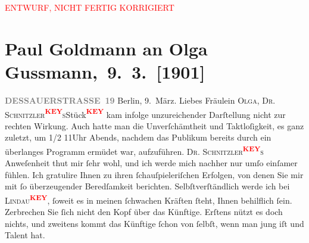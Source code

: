
\begin{center}
            \textcolor{red}{ENTWURF, NICHT FERTIG KORRIGIERT}
                      \end{center}
            
         
         \renewcommand{\erwaehntePersonen}{Personen: Olga Schnitzler}
         \renewcommand{\erwaehnteOrte}{Orte: Berlin, Wien}
         \renewcommand{\erwaehnteWerke}{}
               \section[ Paul Goldmann an Olga Gussmann, 9. 3. {[}1901{]}]{ Paul Goldmann an Olga Gussmann, 9. 3. {[}1901{]}}\nopagebreak{}\rehead{ }\begin{ledgroupsized}[t]{13cm}\normalsize\beginnumbering \toendnotes[C]{\smallbreak\pagebreak[2]} 
\pstart
           \noindent{}\raggedleft{}{\pb}\textcolor{gray}{\textbf{DESSAUERSTRASSE 19}}\pend
           \pstart
           Berlin, 9. März.\pend
           \pstart\center{}Liebes Fräulein \textsc{Olga},\pend\pstart
           \textsc{Dr. Schnitzler\textcolor{red}{\textsuperscript{\textbf{KEY}}}s}Stück\textcolor{red}{\textsuperscript{\textbf{KEY}}} kam infolge unzureichender Darſtellung nicht zur
               rechten Wirkung. Auch hatte man die Unverſchämtheit und Taktloſigkeit, es ganz
               zuletzt, um \strikeout{\textcolor{gray}{1/2}}1/2 11Uhr Abends, nachdem das Publikum bereits durch ein überlanges Programm
               ermüdet war, aufzuführen.\pend
           \pstart
           \textsc{Dr. Schnitzler\textcolor{red}{\textsuperscript{\textbf{KEY}}}s} Anweſenheit
                   thut mir ſehr wohl, und ich werde mich
               nachher nur umſo einſamer fühlen.\pend
           \pstart
           Ich gratulire Ihnen zu ihren ſchauſpieleriſchen Erfolgen, von denen Sie mir mit ſo
               überzeugender Beredſamkeit berichten. {\pb} Selbſtverſtändlich werde ich
               bei \textsc{Lindau\textcolor{red}{\textsuperscript{\textbf{KEY}}}}, ſoweit es in meinen ſchwachen Kräften ſteht, Ihnen behilflich ſein.\pend
           \pstart
           Zerbrechen Sie ſich nicht den Kopf über das Künftige. Erſtens nützt es doch nichts,
               und zweitens kommt das Künftige ſchon von ſelbſt, wenn man jung iſt und Talent hat.\pend

\end{ledgroupsized}
